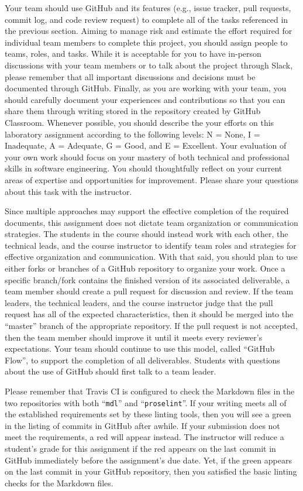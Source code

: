 \documentclass[11pt]{article}
\newcommand{\command}[1]{``\lstinline{#1}''}
\newcommand{\checkmark}{\ding{51}}
\newcommand{\naughtmark}{\ding{55}}
\begin{document}
Your team should use GitHub and its features (e.g., issue tracker, pull
requests, commit log, and code review request) to complete all of the tasks
referenced in the previous section.
%
Aiming to manage risk and estimate the effort required for individual team
members to complete this project, you should assign people to teams, roles, and
tasks. While it is acceptable for you to have in-person discussions with your
team members or to talk about the project through Slack, please remember that
all important discussions and decisions must be documented through GitHub.
Finally, as you are working with your team, you should carefully document your
experiences and contributions so that you can share them through writing stored
in the repository created by GitHub Classroom.
%
Whenever possible, you should describe the your efforts on this laboratory
assignment according to the following levels: N = None, I = Inadequate, A =
Adequate, G = Good, and E = Excellent. Your evaluation of your own work should
focus on your mastery of both technical and professional skills in software
engineering. You should thoughtfully reflect on your current areas of expertise
and opportunities for improvement. Please share your questions about this task
with the instructor.

Since multiple approaches may support the effective completion of the required
documents, this assignment does not dictate team organization or communication
strategies. The students in the course should instead work with each other, the
technical leads, and the course instructor to identify team roles and strategies
for effective organization and communication. With that said, you should plan to
use either forks or branches of a GitHub repository to organize your work.
%
Once a specific branch/fork contains the finished version of its associated
deliverable, a team member should create a pull request for discussion and
review. If the team leaders, the technical leaders, and the course instructor
judge that the pull request has all of the expected characteristics, then it
should be merged into the ``master'' branch of the appropriate repository. If
the pull request is not accepted, then the team member should improve it until
it meets every reviewer's expectations. Your team should continue to use this
model, called ``GitHub Flow'', to support the completion of all deliverables.
%
Students with questions about the use of GitHub should first talk to a team
leader.

Please remember that Travis CI is configured to check the Markdown files in the
two repositories with both \command{mdl} and \command{proselint}.
%
If your writing meets all of the established requirements set by these linting
tools, then you will see a green \checkmark{} in the listing of commits in
GitHub after awhile. If your submission does not meet the requirements, a red
\naughtmark{} will appear instead. The instructor will reduce a student's grade
for this assignment if the red \naughtmark{} appears on the last commit in
GitHub immediately before the assignment's due date. Yet, if the green
\checkmark{} appears on the last commit in your GitHub repository, then you
satisfied the basic linting checks for the Markdown files.
\end{document}
